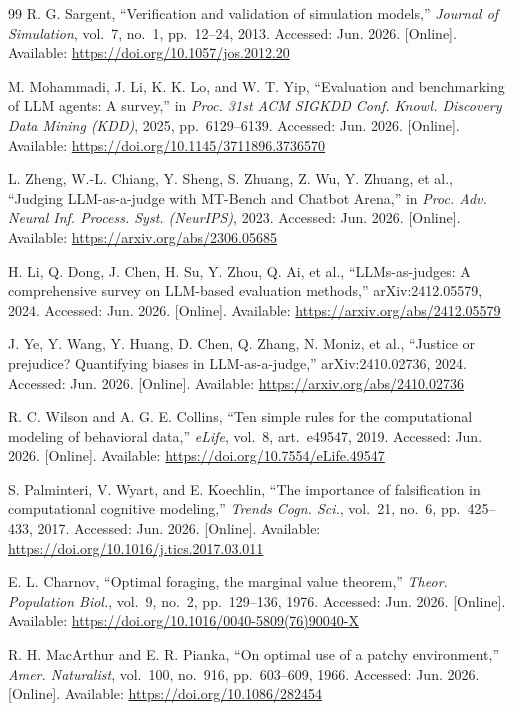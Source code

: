 \begin{thebibliography}{99}
R. G. Sargent, ``Verification and validation of simulation models,''
\emph{Journal of Simulation}, vol.~7, no.~1, pp.~12--24, 2013. Accessed:
Jun. 2026. [Online]. Available: \url{https://doi.org/10.1057/jos.2012.20}

M. Mohammadi, J. Li, K. K. Lo, and W. T. Yip, ``Evaluation and benchmarking
of LLM agents: A survey,'' in \emph{Proc. 31st ACM SIGKDD Conf. Knowl.
Discovery Data Mining (KDD)}, 2025, pp.~6129--6139. Accessed: Jun. 2026.
[Online]. Available:
\url{https://doi.org/10.1145/3711896.3736570}

L. Zheng, W.-L. Chiang, Y. Sheng, S. Zhuang, Z. Wu, Y. Zhuang, et al.,
``Judging LLM-as-a-judge with MT-Bench and Chatbot Arena,'' in \emph{Proc.
Adv. Neural Inf. Process. Syst. (NeurIPS)}, 2023. Accessed: Jun. 2026.
[Online]. Available: \url{https://arxiv.org/abs/2306.05685}

H. Li, Q. Dong, J. Chen, H. Su, Y. Zhou, Q. Ai, et al., ``LLMs-as-judges: A
comprehensive survey on LLM-based evaluation methods,'' arXiv:2412.05579,
2024. Accessed: Jun. 2026. [Online]. Available:
\url{https://arxiv.org/abs/2412.05579}

J. Ye, Y. Wang, Y. Huang, D. Chen, Q. Zhang, N. Moniz, et al., ``Justice or
prejudice? Quantifying biases in LLM-as-a-judge,'' arXiv:2410.02736, 2024.
Accessed: Jun. 2026. [Online]. Available:
\url{https://arxiv.org/abs/2410.02736}

R. C. Wilson and A. G. E. Collins, ``Ten simple rules for the computational
modeling of behavioral data,'' \emph{eLife}, vol.~8, art.~e49547, 2019.
Accessed: Jun. 2026. [Online]. Available:
\url{https://doi.org/10.7554/eLife.49547}

S. Palminteri, V. Wyart, and E. Koechlin, ``The importance of falsification in
computational cognitive modeling,'' \emph{Trends Cogn. Sci.}, vol.~21, no.~6,
pp.~425--433, 2017. Accessed: Jun. 2026. [Online]. Available:
\url{https://doi.org/10.1016/j.tics.2017.03.011}

E. L. Charnov, ``Optimal foraging, the marginal value theorem,'' \emph{Theor.
Population Biol.}, vol.~9, no.~2, pp.~129--136, 1976. Accessed: Jun. 2026.
[Online]. Available: \url{https://doi.org/10.1016/0040-5809(76)90040-X}

R. H. MacArthur and E. R. Pianka, ``On optimal use of a patchy environment,''
\emph{Amer. Naturalist}, vol.~100, no.~916, pp.~603--609, 1966. Accessed:
Jun. 2026. [Online]. Available: \url{https://doi.org/10.1086/282454}

\end{thebibliography}
